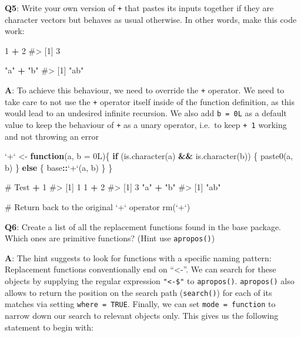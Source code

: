 \documentclass[
]{krantz}
\makeatletter
\newenvironment{Shaded}{\begin{snugshade}}{\end{snugshade}}
\newcommand{\CommentTok}[1]{\textcolor[rgb]{0.56,0.35,0.01}{\textit{#1}}}
\newcommand{\ControlFlowTok}[1]{\textcolor[rgb]{0.13,0.29,0.53}{\textbf{#1}}}
\newcommand{\DataTypeTok}[1]{\textcolor[rgb]{0.13,0.29,0.53}{#1}}
\newcommand{\DecValTok}[1]{\textcolor[rgb]{0.00,0.00,0.81}{#1}}
\newcommand{\KeywordTok}[1]{\textcolor[rgb]{0.13,0.29,0.53}{\textbf{#1}}}
\newcommand{\NormalTok}[1]{#1}
\newcommand{\OperatorTok}[1]{\textcolor[rgb]{0.81,0.36,0.00}{\textbf{#1}}}
\newcommand{\StringTok}[1]{\textcolor[rgb]{0.31,0.60,0.02}{#1}}
\newenvironment{kframe}{%
\medskip{}
\setlength{\fboxsep}{.8em}
 \def\at@end@of@kframe{}%
 \ifinner\ifhmode%
  \def\at@end@of@kframe{\end{minipage}}%
  \begin{minipage}{\columnwidth}%
 \fi\fi%
 \def\FrameCommand##1{\hskip\@totalleftmargin \hskip-\fboxsep
 \colorbox{shadecolor}{##1}\hskip-\fboxsep
     \hskip-\linewidth \hskip-\@totalleftmargin \hskip\columnwidth}%
 \MakeFramed {\advance\hsize-\width
   \@totalleftmargin\z@ \linewidth\hsize
   \@setminipage}}%
 {\par\unskip\endMakeFramed%
 \at@end@of@kframe}
\renewenvironment{Shaded}{\begin{kframe}}{\end{kframe}}
\renewcommand{\KeywordTok} [1]{\textcolor[rgb]{0.00,0.44,0.13}{{#1}}}
\renewcommand{\DataTypeTok}[1]{\textcolor[rgb]{0.56,0.13,0.00}{{#1}}}
\renewcommand{\DecValTok}  [1]{\textcolor[rgb]{0.25,0.63,0.44}{{#1}}}
\renewcommand{\StringTok}  [1]{\textcolor[rgb]{0.25,0.44,0.63}{{#1}}}
\renewcommand{\CommentTok} [1]{\textcolor[rgb]{0.38,0.63,0.69}{{#1}}}
\renewcommand{\NormalTok}  [1]{{#1}}
\makeatother
\begin{document}
\textbf{{Q5}}: Write your own version of \texttt{+} that pastes its inputs together if they are character vectors but behaves as usual otherwise. In other words, make this code work:

\begin{Shaded}
\begin{Highlighting}[]
\DecValTok{1} \OperatorTok{+}\StringTok{ }\DecValTok{2}
\CommentTok{#> [1] 3}

\StringTok{"a"} \OperatorTok{+}\StringTok{ "b"}
\CommentTok{#> [1] "ab"}
\end{Highlighting}
\end{Shaded}

\textbf{{A}}: To achieve this behaviour, we need to override the \texttt{+} operator. We need to take care to not use the \texttt{+} operator itself inside of the function definition, as this would lead to an undesired infinite recursion. We also add \texttt{b\ =\ 0L} as a default value to keep the behaviour of \texttt{+} as a unary operator, i.e.~to keep \texttt{+\ 1} working and not throwing an error

\begin{Shaded}
\begin{Highlighting}[]
\StringTok{`}\DataTypeTok{+}\StringTok{`}\NormalTok{ <-}\StringTok{ }\ControlFlowTok{function}\NormalTok{(a, }\DataTypeTok{b =}\NormalTok{ 0L)\{}
  \ControlFlowTok{if}\NormalTok{ (}\KeywordTok{is.character}\NormalTok{(a) }\OperatorTok{&&}\StringTok{ }\KeywordTok{is.character}\NormalTok{(b)) \{}
    \KeywordTok{paste0}\NormalTok{(a, b)}
\NormalTok{  \} }\ControlFlowTok{else}\NormalTok{ \{}
\NormalTok{    base}\OperatorTok{::}\StringTok{`}\DataTypeTok{+}\StringTok{`}\NormalTok{(a, b)  }
\NormalTok{  \}}
\NormalTok{\}}

\CommentTok{# Test}
\OperatorTok{+}\StringTok{ }\DecValTok{1}
\CommentTok{#> [1] 1}
\DecValTok{1} \OperatorTok{+}\StringTok{ }\DecValTok{2}
\CommentTok{#> [1] 3}
\StringTok{"a"} \OperatorTok{+}\StringTok{ "b"}
\CommentTok{#> [1] "ab"}

\CommentTok{# Return back to the original `+` operator}
\KeywordTok{rm}\NormalTok{(}\StringTok{`}\DataTypeTok{+}\StringTok{`}\NormalTok{)}
\end{Highlighting}
\end{Shaded}

\textbf{{Q6}}: Create a list of all the replacement functions found in the base package. Which ones are primitive functions? (Hint use \texttt{apropos()})

\textbf{{A}}: The hint suggests to look for functions with a specific naming pattern: Replacement functions conventionally end on ``\textless-''. We can search for these objects by supplying the regular expression \texttt{"\textless{}-\$"} to \texttt{apropos()}. \texttt{apropos()} also allows to return the position on the search path (\texttt{search()}) for each of its matches via setting \texttt{where\ =\ TRUE}. Finally, we can set \texttt{mode\ =\ function} to narrow down our search to relevant objects only. This gives us the following statement to begin with:
\end{document}
